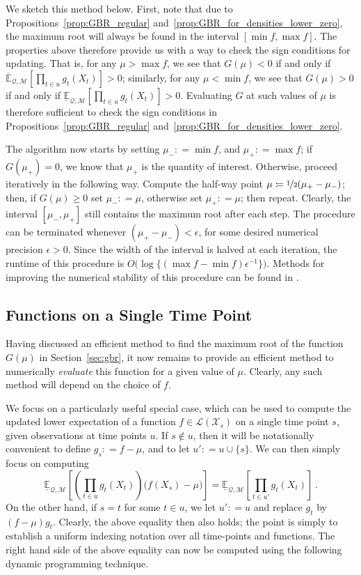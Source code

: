 \documentclass[twoside,11pt]{article}
\newcommand{\states}{\mathcal{X}}
\newcommand{\lexp}{\underline{\mathbb{E}}_{\rateset,\mathcal{M}}}
\newcommand{\uexp}{\overline{\mathbb{E}}_{\rateset,\mathcal{M}}}
\newcommand{\gambles}{\mathcal{L}}
\newcommand{\rateset}{\mathcal{Q}}
\newcommand{\coloneqq}{:\!=}
\begin{document}
We sketch this method below. First, note that due to Propositions~\ref{prop:GBR_regular} and~\ref{prop:GBR_for_densities_lower_zero}, the maximum root will always be found in the interval $[\min f, \max f]$. The properties above therefore provide us with a way to check the sign conditions for updating. That is, for any $\mu>\max f$, we see that $G(\mu)<0$ if and only if $\uexp[\prod_{t\in u} g_{t}(X_{t})]>0$;  
similarly, for any $\mu < \min f$, we see that $G(\mu)>0$ if and only if $\lexp[\prod_{t\in u} g_{t}(X_{t})]>0$. Evaluating $G$ at such values of $\mu$ is therefore sufficient to check the sign conditions in Propositions~\ref{prop:GBR_regular} and~\ref{prop:GBR_for_densities_lower_zero}.

The algorithm now starts by setting $\mu_-\coloneqq \min f$, and $\mu_+\coloneqq \max f$; if $G(\mu_+)=0$, we know that $\mu_+$ is the quantity of interest. Otherwise, proceed iteratively in the following way. Compute the half-way point $\mu\coloneqq \nicefrac{1}{2}(\mu_+-\mu_-)$; then, if $G(\mu)\geq 0$ set $\mu_-\coloneqq \mu$, otherwise set $\mu_+\coloneqq\mu$; then repeat. Clearly, the interval $[\mu_-,\mu_+]$ still contains the maximum root after each step. The procedure can be terminated whenever $(\mu_+-\mu_-)<\epsilon$, for some desired numerical precision $\epsilon>0$. Since the width of the interval is halved at each iteration, the runtime of this procedure is $O\bigl(\log\{(\max f - \min f)\epsilon^{-1}\}\bigr)$.
Methods for improving the numerical stability of this procedure can be found in \cite[Section 2.7.3]{de2015credal}. 

\subsection{Functions on a Single Time Point}\label{sec:funcs_single_time}

Having discussed an efficient method to find the maximum root of the function $G(\mu)$ in Section~\ref{sec:gbr}, it now remains to provide an efficient method to numerically \emph{evaluate} this function for a given value of $\mu$. Clearly, any such method will depend on the choice of $f$.

We focus on a particularly useful special case, which can be used to compute the updated lower expectation of a function $f\in\gambles(\states_s)$ on a single time point $s$, given observations at time points $u$. If $s\notin u$, then it will be notationally convenient to define $g_s\coloneqq f - \mu$, and to let $u'\coloneqq u\cup \{s\}$. We can then simply focus on computing
\begin{equation*}
\lexp\left[ \left(\prod_{t\in u}g_{t}(X_{t})\right)\bigl(f(X_s) - \mu\bigr) \right] = \lexp\left[ \prod_{t\in u'}g_{t}(X_{t})\right]\,.
\end{equation*}
On the other hand, if $s = t$ for some $t\in u$, we let $u'\coloneqq u$ and replace $g_{t}$ by $(f-\mu)g_{t}$. Clearly, the above equality then also holds; the point is simply to establish a uniform indexing notation over all time-points and functions. The right hand side of the above equality can now be computed using the following dynamic programming technique. 
\end{document}
